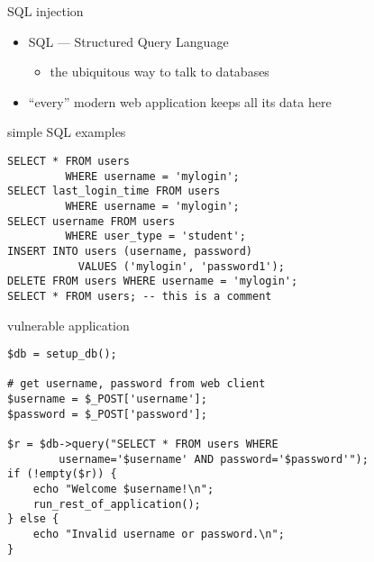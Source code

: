 \begin{frame}{SQL injection}
    \begin{itemize}
        \item SQL --- Structured Query Language
            \begin{itemize}
            \item the ubiquitous way to talk to databases
            \end{itemize}
        \item ``every'' modern web application keeps all its data here
    \end{itemize}
\end{frame}

\begin{frame}[fragile,label=simpleSQL]{simple SQL examples}
\begin{verbatim}
SELECT * FROM users
         WHERE username = 'mylogin';
SELECT last_login_time FROM users
         WHERE username = 'mylogin';
SELECT username FROM users 
         WHERE user_type = 'student';
INSERT INTO users (username, password)
           VALUES ('mylogin', 'password1');
DELETE FROM users WHERE username = 'mylogin';
SELECT * FROM users; -- this is a comment
\end{verbatim}
\end{frame}

\begin{frame}[fragile,label=vulnApp]{vulnerable application}
    \vspace{-.25cm}
\begin{verbatim}
$db = setup_db();

# get username, password from web client
$username = $_POST['username'];
$password = $_POST['password'];

$r = $db->query("SELECT * FROM users WHERE 
        username='$username' AND password='$password'");
if (!empty($r)) {
    echo "Welcome $username!\n";
    run_rest_of_application();
} else {
    echo "Invalid username or password.\n";
}
\end{verbatim}
\end{frame}

